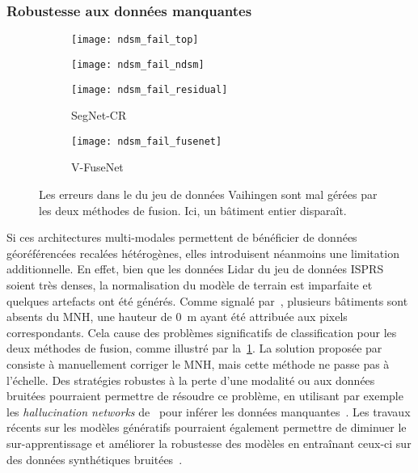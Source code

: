 \subsubsection{Robustesse aux données manquantes}

\begin{figure}[h]
	\captionsetup[subfigure]{singlelinecheck=off,justification=centering}
    \captionsetup[subfigure]{labelformat=empty}
    \begin{subfigure}{0.24\textwidth}
    	\texttt{[image: ndsm\_fail\_top]}
        \caption{}
    \end{subfigure}
    \begin{subfigure}{0.24\textwidth}
    	\texttt{[image: ndsm\_fail\_ndsm]}
        \caption{}
    \end{subfigure}
    \begin{subfigure}{0.24\textwidth}
    	\texttt{[image: ndsm\_fail\_residual]}
        \caption{SegNet-CR}
    \end{subfigure}
    \begin{subfigure}{0.24\textwidth}
    	\texttt{[image: ndsm\_fail\_fusenet]}
        \caption{V-FuseNet}
    \end{subfigure}
	\caption{Les erreurs dans le  du jeu de données  Vaihingen sont mal gérées par les deux méthodes de fusion. Ici, un bâtiment entier disparaît.}
    \label{fig:ndsm_fail}
\end{figure}

Si ces architectures multi-modales permettent de bénéficier de données géoréférencées recalées hétérogènes, elles introduisent néanmoins une limitation additionnelle. En effet, bien que les données \gls{Lidar} du jeu de données \gls{ISPRS} soient très denses, la normalisation du modèle de terrain est imparfaite et quelques artefacts ont été générés. Comme signalé par~\citet{marmanis_classification_2017}, plusieurs bâtiments sont absents du \gls{MNH}, une hauteur de \SI{0}{\meter} ayant été attribuée aux pixels correspondants. Cela cause des problèmes significatifs de classification pour les deux méthodes de fusion, comme illustré par la~\cref{fig:ndsm_fail}. La solution proposée par~\cite{marmanis_classification_2017} consiste à manuellement corriger le \gls{MNH}, mais cette méthode ne passe pas à l'échelle. Des stratégies robustes à la perte d'une modalité ou aux données bruitées pourraient permettre de résoudre ce problème, en utilisant par exemple les \emph{hallucination networks} de~\citet{hoffman_learning_2016} pour inférer les données manquantes~\cite{kampffmeyer_semantic_2016}. Les travaux récents sur les modèles génératifs pourraient également permettre de diminuer le sur-apprentissage et améliorer la robustesse des modèles en entraînant ceux-ci sur des données synthétiques bruitées~\cite{xie_adversarial_2017}.

